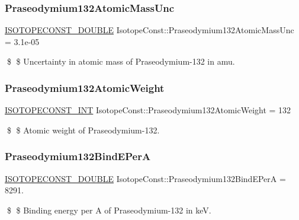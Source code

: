\subsubsection{\texorpdfstring{Praseodymium132\+Atomic\+Mass\+Unc}{Praseodymium132AtomicMassUnc}}
{\footnotesize\ttfamily \mbox{\hyperlink{group___isotope_const-_macros_ga8f45a7272ce02c0b4c65c44636ed719a}{I\+S\+O\+T\+O\+P\+E\+C\+O\+N\+S\+T\+\_\+\+D\+O\+U\+B\+LE}} Isotope\+Const\+::\+Praseodymium132\+Atomic\+Mass\+Unc = 3.\+1e-\/05}

\$ \$ Uncertainty in atomic mass of Praseodymium-\/132 in amu. \mbox{\label{group___isotope_const-_praseodymium-_pr132_ga6a6237195c2ad53d164ba20e9800cb66}} 
\subsubsection{\texorpdfstring{Praseodymium132\+Atomic\+Weight}{Praseodymium132AtomicWeight}}
{\footnotesize\ttfamily \mbox{\hyperlink{group___isotope_const-_macros_ga5f18360b3e99483a35c32d789e62621c}{I\+S\+O\+T\+O\+P\+E\+C\+O\+N\+S\+T\+\_\+\+I\+NT}} Isotope\+Const\+::\+Praseodymium132\+Atomic\+Weight = 132}

\$ \$ Atomic weight of Praseodymium-\/132. \mbox{\label{group___isotope_const-_praseodymium-_pr132_ga0ee9591f3836da47b277c041db754aed}} 
\subsubsection{\texorpdfstring{Praseodymium132\+Bind\+E\+PerA}{Praseodymium132BindEPerA}}
{\footnotesize\ttfamily \mbox{\hyperlink{group___isotope_const-_macros_ga8f45a7272ce02c0b4c65c44636ed719a}{I\+S\+O\+T\+O\+P\+E\+C\+O\+N\+S\+T\+\_\+\+D\+O\+U\+B\+LE}} Isotope\+Const\+::\+Praseodymium132\+Bind\+E\+PerA = 8291.}

\$ \$ Binding energy per A of Praseodymium-\/132 in keV. \mbox{\label{group___isotope_const-_praseodymium-_pr132_gae4342e72a0a3789e9cae47b588c22f34}} 
